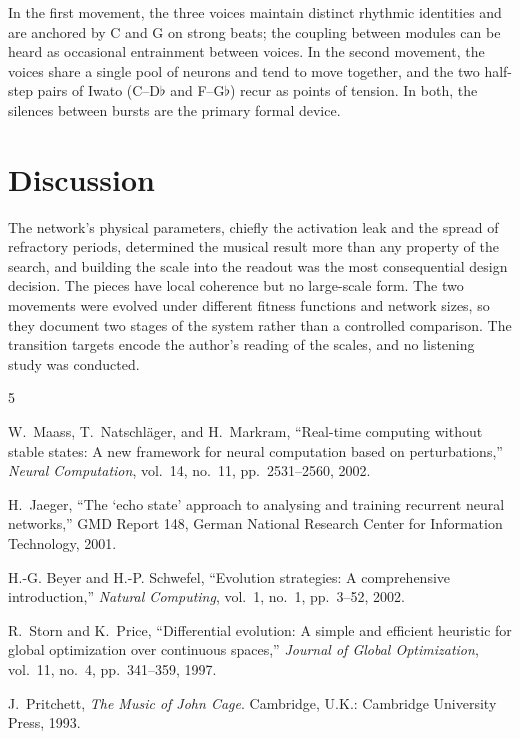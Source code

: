 \documentclass[conference]{IEEEtran}
\newcommand{\fl}{$\flat$}
\begin{document}
In the first movement, the three voices maintain distinct rhythmic identities and are anchored by C and G on strong beats; the coupling between modules can be heard as occasional entrainment between voices. In the second movement, the voices share a single pool of neurons and tend to move together, and the two half-step pairs of Iwato (C--D\fl{} and F--G\fl) recur as points of tension. In both, the silences between bursts are the primary formal device.

\section{Discussion}

The network's physical parameters, chiefly the activation leak and the spread of refractory periods, determined the musical result more than any property of the search, and building the scale into the readout was the most consequential design decision. The pieces have local coherence but no large-scale form. The two movements were evolved under different fitness functions and network sizes, so they document two stages of the system rather than a controlled comparison. The transition targets encode the author's reading of the scales, and no listening study was conducted.

\begin{thebibliography}{5}

W.~Maass, T.~Natschläger, and H.~Markram, ``Real-time computing without stable states: A new framework for neural computation based on perturbations,'' \emph{Neural Computation}, vol.~14, no.~11, pp.~2531--2560, 2002.

H.~Jaeger, ``The `echo state' approach to analysing and training recurrent neural networks,'' GMD Report 148, German National Research Center for Information Technology, 2001.

H.-G. Beyer and H.-P. Schwefel, ``Evolution strategies: A comprehensive introduction,'' \emph{Natural Computing}, vol.~1, no.~1, pp.~3--52, 2002.

R.~Storn and K.~Price, ``Differential evolution: A simple and efficient heuristic for global optimization over continuous spaces,'' \emph{Journal of Global Optimization}, vol.~11, no.~4, pp.~341--359, 1997.

J.~Pritchett, \emph{The Music of John Cage}. Cambridge, U.K.: Cambridge University Press, 1993.

\end{thebibliography}
\end{document}
